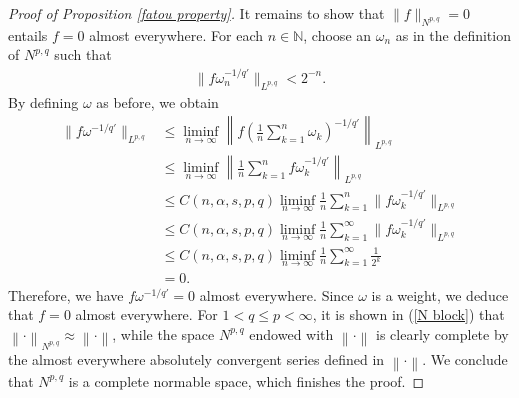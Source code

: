\documentclass[10pt,reqno]{amsart}
\numberwithin{equation}{section}
\begin{document}
\begin{proof}[Proof of Proposition \ref{fatou property}]
It remains to show that $\|f\|_{N^{p,q}}=0$ entails $f=0$ almost everywhere. For each $n\in\mathbb{N}$, choose an $\omega_{n}$ as in the definition of $N^{p,q}$ such that 
\begin{align*}
\|f\omega_{n}^{-1/q'}\|_{L^{p,q}}<2^{-n}.
\end{align*}
By defining $\omega$ as before, we obtain
\begin{align*}
\|f\omega^{-1/q'}\|_{L^{p,q}}&\leq\liminf_{n\rightarrow\infty}\left\|f\left(\frac{1}{n}\sum_{k=1}^{n}\omega_{k}\right)^{-1/q'}\right\|_{L^{p,q}}\\
&\leq\liminf_{n\rightarrow\infty}\left\|\frac{1}{n}\sum_{k=1}^{n}f\omega_{k}^{-1/q'}\right\|_{L^{p,q}}\\
&\leq C(n,\alpha,s,p,q)\liminf_{n\rightarrow\infty}\frac{1}{n}\sum_{k=1}^{n}\|f\omega_{k}^{-1/q'}\|_{L^{p,q}}\\
&\leq C(n,\alpha,s,p,q)\liminf_{n\rightarrow\infty}\frac{1}{n}\sum_{k=1}^{\infty}\|f\omega_{k}^{-1/q'}\|_{L^{p,q}}\\
&\leq C(n,\alpha,s,p,q)\liminf_{n\rightarrow\infty}\frac{1}{n}\sum_{k=1}^{\infty}\frac{1}{2^{k}}\\
&=0.
\end{align*}
Therefore, we have $f\omega^{-1/q'}=0$ almost everywhere. Since $\omega$ is a weight, we deduce that $f=0$ almost everywhere. For $1<q\leq p<\infty$, it is shown in (\ref{N block}) that $\left\|\cdot\right\|_{N^{p,q}}\approx\left\|\cdot\right\|$, while the space $N^{p,q}$ endowed with $\left\|\cdot\right\|$ is clearly complete by the almost everywhere absolutely convergent series defined in $\left\|\cdot\right\|$. We conclude that $N^{p,q}$ is a complete normable space, which finishes the proof.
\end{proof}
\end{document}
